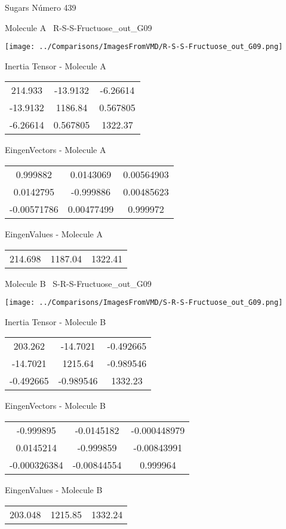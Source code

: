 \vtab[-3cm]
\begin{center}
{\large Sugars \tab Número 439}
\end{center}
\begin{multicols}{2}
\begin{center}

Molecule A \
R-S-S-Fructuose\_out\_G09

\texttt{[image: ../Comparisons/ImagesFromVMD/R-S-S-Fructuose\_out\_G09.png]}

Inertia Tensor - Molecule A \\
\begin{tabular}{|c c c|}
214.933	 & 	-13.9132	 & 	-6.26614	 \\
-13.9132	 & 	1186.84	 & 	0.567805	 \\
-6.26614	 & 	0.567805	 & 	1322.37
\end{tabular}

\vtab
 EingenVectors - Molecule A     \\
\begin{tabular}{|c c c|}
0.999882	 & 	0.0143069	 & 	0.00564903	 \\
0.0142795	 & 	-0.999886	 & 	0.00485623	 \\
-0.00571786	 & 	0.00477499	 & 	0.999972
\end{tabular}

\vtab
 EingenValues - Molecule A     \\
\begin{tabular}{|c c c|}
214.698	 & 	1187.04	 & 	1322.41	 \\
\end{tabular}
\columnbreak

Molecule B \
S-R-S-Fructuose\_out\_G09

\texttt{[image: ../Comparisons/ImagesFromVMD/S-R-S-Fructuose\_out\_G09.png]}

Inertia Tensor - Molecule B \\
\begin{tabular}{|c c c|}
203.262	 & 	-14.7021	 & 	-0.492665	 \\
-14.7021	 & 	1215.64	 & 	-0.989546	 \\
-0.492665	 & 	-0.989546	 & 	1332.23
\end{tabular}

\vtab
 EingenVectors - Molecule B     \\
\begin{tabular}{|c c c|}
-0.999895	 & 	-0.0145182	 & 	-0.000448979	 \\
0.0145214	 & 	-0.999859	 & 	-0.00843991	 \\
-0.000326384	 & 	-0.00844554	 & 	0.999964
\end{tabular}

\vtab
 EingenValues - Molecule B     \\
\begin{tabular}{|c c c|}
203.048	 & 	1215.85	 & 	1332.24	 \\
\end{tabular}

\end{center}
\end{multicols}

